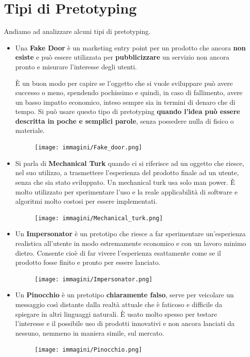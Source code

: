 \section{Tipi di Pretotyping}
Andiamo ad analizzare alcuni tipi di pretotyping.
\begin{itemize}
	\item Una \textbf{Fake Door} è un marketing entry point per un prodotto che ancora \textbf{non esiste} e può essere utilizzata per \textbf{pubblicizzare}
	un servizio non ancora pronto e misurare l'interesse degli utenti.

	È un buon modo per capire se l'oggetto che si vuole sviluppare può avere successo o meno, spendendo pochissimo e quindi, in caso di fallimento, avere
	un basso impatto economico, inteso sempre sia in termini di denaro che di tempo. Si può usare questo tipo di pretotyping \textbf{quando l'idea può
	essere descritta in poche e semplici parole}, senza possedere nulla di fisico o materiale.
	\pagebreak
	\begin{figure}[!h]
		\centering
		\texttt{[image: immagini/Fake\_door.png]}
	\end{figure}

	\item Si parla di \textbf{Mechanical Turk} quando ci si riferisce ad un oggetto che riesce, nel suo utilizzo, a trasmettere l'esperienza del prodotto
	finale ad un utente, senza che sia stato sviluppato. Un mechanical turk usa solo man power. È molto utilizzato per sperimentare l'uso e la reale
	applicabilità di software e algoritmi molto costosi per essere implementati.
	\begin{figure}[!h]
		\centering
		\texttt{[image: immagini/Mechanical\_turk.png]}
	\end{figure}

	\item Un \textbf{Impersonator} è un pretotipo che riesce a far sperimentare un'esperienza realistica all'utente in modo estremamente economico e con
	un lavoro minimo dietro. Consente cioè di far vivere l'esperienza esattamente come se il prodotto fosse finito e pronto per essere lanciato.
	\begin{figure}[!h]
		\centering
		\texttt{[image: immagini/Impersonator.png]}
	\end{figure}

	\item Un \textbf{Pinocchio} è un pretotipo \textbf{chiaramente falso}, serve per veicolare un messaggio così distante dalla realtà attuale che è
	faticoso e difficile da spiegare in altri linguaggi naturali. È usato molto spesso per testare l'interesse e il possibile uso di prodotti innovativi
	e non ancora lanciati da nessuno, nemmeno in maniera simile, sul mercato.
	\pagebreak
	\begin{figure}[!h]
		\centering
		\texttt{[image: immagini/Pinocchio.png]}
	\end{figure}


\end{itemize}
